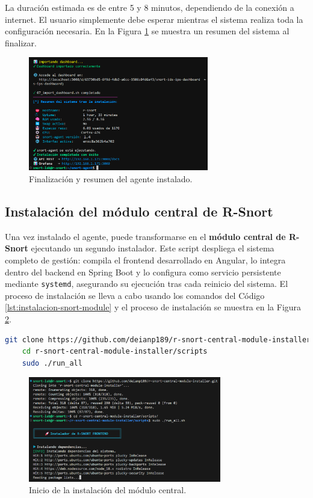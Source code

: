 \documentclass[11pt,a4paper,twoside]{report}
\begin{document}
La duración estimada es de entre 5 y 8 minutos, dependiendo de la conexión a internet. El usuario simplemente debe esperar mientras el sistema realiza toda la configuración necesaria. En la Figura \ref{fig:resumen-snort-agent} se muestra un resumen del sistema al finalizar.

\begin{figure}[H]
	\centering
	\includegraphics[width=0.7\textwidth]{install/5.png}
	\caption{Finalización y resumen del agente instalado.}
	\label{fig:resumen-snort-agent}
\end{figure}


\subsection{Instalación del módulo central de R-Snort}

Una vez instalado el agente, puede transformarse en el \textbf{módulo central de R-Snort} ejecutando un segundo instalador. Este script despliega el sistema completo de gestión: compila el frontend desarrollado en Angular, lo integra dentro del backend en Spring Boot y lo configura como servicio persistente mediante \texttt{systemd}, asegurando su ejecución tras cada reinicio del sistema. El proceso de instalación se lleva a cabo usando los comandos del Código \ref{lst:instalacion-snort-module} y el proceso de instalación se muestra en la Figura \ref{fig:inicio-central-module}.

\begin{lstlisting}[language=bash, caption={Comandos de instalación del agente.}, label={lst:instalacion-snort-module}]
	git clone https://github.com/deianp189/r-snort-central-module-installer.git
	cd r-snort-central-module-installer/scripts
	sudo ./run_all
\end{lstlisting}

\begin{figure}[H]
	\centering
	\includegraphics[width=0.75\textwidth]{install/6.png}
	\caption{Inicio de la instalación del módulo central.}
	\label{fig:inicio-central-module}
\end{figure}
\end{document}

